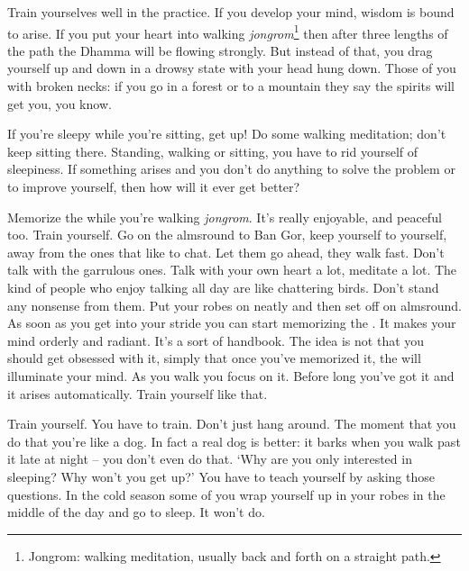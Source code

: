 Train yourselves well in the practice. If you develop your mind, wisdom is bound to arise. If you put your heart into walking \textit{jongrom}\footnote{Jongrom: walking meditation, usually back and forth on a straight path.} then after three lengths of the path the Dhamma will be flowing strongly. But instead of that, you drag yourself up and down in a drowsy state with your head hung down. Those of you with broken necks: if you go in a forest or to a mountain they say the spirits will get you, you know.

If you're sleepy while you're sitting, get up! Do some walking meditation; don't keep sitting there. Standing, walking or sitting, you have to rid yourself of sleepiness. If something arises and you don't do anything to solve the problem or to improve yourself, then how will it ever get better?

Memorize the  while you're walking \textit{jongrom}. It's really enjoyable, and peaceful too. Train yourself. Go on the almsround to Ban Gor, keep yourself to yourself, away from the ones that like to chat. Let them go ahead, they walk fast. Don't talk with the garrulous ones. Talk with your own heart a lot, meditate a lot. The kind of people who enjoy talking all day are like chattering birds. Don't stand any nonsense from them. Put your robes on neatly and then set off on almsround. As soon as you get into your stride you can start memorizing the . It makes your mind orderly and radiant. It's a sort of handbook. The idea is not that you should get obsessed with it, simply that once you've memorized it, the  will illuminate your mind. As you walk you focus on it. Before long you've got it and it arises automatically. Train yourself like that.

Train yourself. You have to train. Don't just hang around. The moment that you do that you're like a dog. In fact a real dog is better: it barks when you walk past it late at night -- you don't even do that. `Why are you only interested in sleeping? Why won't you get up?' You have to teach yourself by asking those questions. In the cold season some of you wrap yourself up in your robes in the middle of the day and go to sleep. It won't do.

